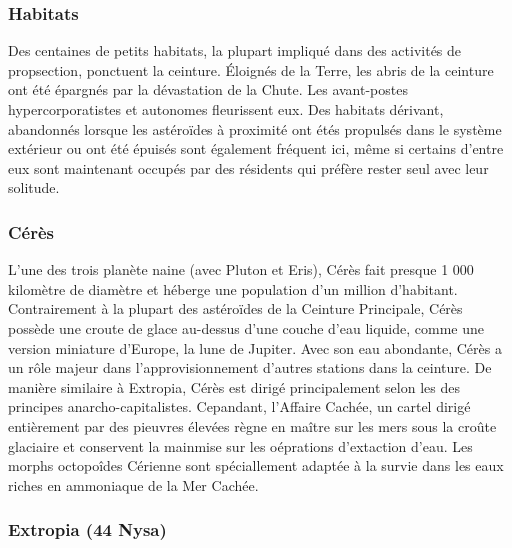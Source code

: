                                                                \subsubsection{Habitats} \label{sec:habitats-3} 

                                                               Des centaines de petits habitats, la plupart impliqué dans des activités de propsection, ponctuent la ceinture. Éloignés de la Terre, les abris de la ceinture ont été épargnés par la dévastation de la Chute. Les avant-postes hypercorporatistes et autonomes fleurissent eux. Des habitats dérivant, abandonnés lorsque les astéroïdes à proximité ont étés propulsés dans le système extérieur ou ont été épuisés sont également fréquent ici, même si certains d'entre eux sont maintenant occupés par des résidents qui préfère rester seul avec leur solitude. 

                                                               \subsubsection{Cérès} \label{sec:ceres} 

                                                               L'une des trois planète naine (avec Pluton et Eris), Cérès fait presque 1 000 kilomètre de diamètre et héberge une population d'un million d'habitant. Contrairement à la plupart des astéroïdes de la Ceinture Principale, Cérès possède une croute de glace au-dessus d'une couche d'eau liquide, comme une version miniature d'Europe, la lune de Jupiter. Avec son eau abondante, Cérès a un rôle majeur dans l'approvisionnement d'autres stations dans la ceinture. De manière similaire à Extropia, Cérès est dirigé principalement selon les des principes anarcho-capitalistes. Cepandant, l'Affaire Cachée, un cartel dirigé entièrement par des pieuvres élevées règne en maître sur les mers sous la croûte glaciaire et conservent la mainmise sur les oéprations d'extaction d'eau. Les morphs octopoîdes Cérienne sont spéciallement adaptée à la survie dans les eaux riches en ammoniaque de la Mer Cachée. 

                                                               \subsubsection{Extropia (44 Nysa)} \label{sec:extropia-44-nysa} 

